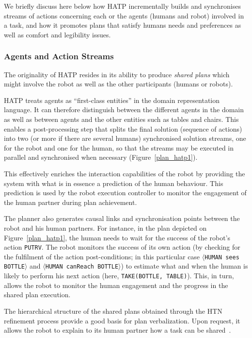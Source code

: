 \documentclass[preprint,3p,times]{elsarticle}
\newcommand{\concept}[1]{{\small \texttt{#1}}}
\newcommand{\stmt}[1]{{\footnotesize\tt$\langle$#1\relax$\rangle$}}
\begin{document}
We briefly discuss here below how HATP incrementally builds and synchronises streams of actions concerning each or the agents (humans and robot) involved in a task, and how it promotes plans that satisfy humans needs and preferences as well as comfort and legibility issues.

\subsubsection{Agents and Action Streams}

The originality of HATP resides in its ability to produce \emph{shared plans} which might involve 
the robot as well as the other participants (humans or robots).

HATP treats agents as ``first-class
entities'' in the domain representation language. It can therefore
distinguish between the different agents in the domain as well as
between agents and the other entities such as tables and chairs. This
enables a post-processing step that splits the final
solution (sequence of actions) into two (or more if there are several
humans) synchronised solution
streams, one for the robot and one for the human, so that the streams may be executed in
parallel and synchronised when necessary (Figure~\ref{plan_hatp1}).

This effectively enriches the interaction capabilities of the robot by providing
the system with what is in essence a prediction of the human behaviour. This
prediction is used by the robot execution controller to monitor the engagement
of the human partner during plan achievement.

The planner also generates causal links and synchronisation points between the robot and his human partners. For
instance, in the plan depicted on Figure~\ref{plan_hatp1}, the human needs to
wait for the success of the robot's action {\tt PUTRV}. The robot monitors the
success of its own action (by checking for the fulfilment of the action
post-conditions; in this particular case \stmt{HUMAN sees BOTTLE} and
\stmt{HUMAN canReach BOTTLE}) to estimate what and when the human is likely to
perform his next action (here, \concept{TAKE(BOTTLE, TABLE)}). This, in turn,
allows the robot to monitor the human engagement and the progress in the shared
plan execution.

The hierarchical structure of the shared plans obtained through the HTN
refinement process provide a good basis for plan verbalization. Upon request, it allows the
robot to explain to its human partner how a task can be
shared~\cite{fiore2016planning,milliez2016using}.
\end{document}
